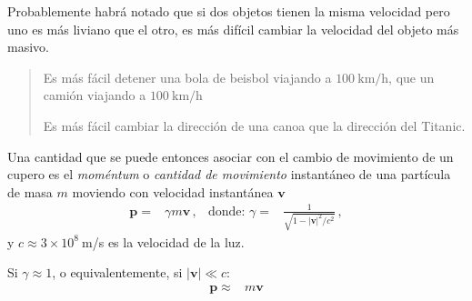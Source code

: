 Probablemente habrá notado que si dos objetos tienen la misma velocidad pero uno es más liviano que el otro, es más difícil cambiar la velocidad del objeto más masivo. 

\begin{frame}[plain]
  \begin{quote}
  Es más fácil detener una bola de beisbol viajando a $\SI{100}{\kilo\meter\per\hour}$, que un camión viajando a $\SI{100}{\kilo\meter\per\hour}$

Es más fácil cambiar la dirección de una canoa que la dirección del Titanic.
\end{quote}
\end{frame}

Una cantidad que se puede entonces asociar con el cambio de movimiento de un cupero es el \emph{moméntum} o \emph{cantidad de movimiento} instantáneo de una partícula de masa $m$ moviendo con velocidad instantánea $\mathbf{v}$
\begin{align}
  \mathbf{p}=&\gamma m \mathbf{v}\,, &\text{donde: } \gamma=&\frac{1}{\sqrt{1-{|\mathbf{v}|^2}/{c^2}}}\,,
\end{align}
y $c\approx 3\times 10^8\ $m/s es la velocidad de la luz.

Si $\gamma\approx1$, o equivalentemente, si $|\mathbf{v}|\ll c$:
\begin{align}
  \mathbf{p}\approx &m \mathbf{v}
\end{align}


\begin{extrapage}
  \newpage
  
  \qquad
  \newpage
\end{extrapage}

